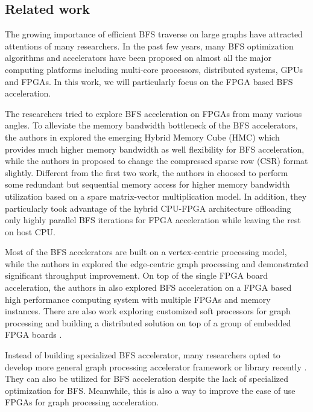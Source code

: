 \subsection{Related work}
The growing importance of efficient BFS traverse on large graphs 
have attracted attentions of many researchers. In the past few years, 
many BFS optimization algorithms and accelerators have been proposed 
on almost all the major computing platforms including multi-core processors, 
distributed systems, GPUs and FPGAs. In this work, we will 
particularly focus on the FPGA based BFS acceleration. 

The researchers tried to explore BFS acceleration 
on FPGAs from many various angles.
To alleviate the memory bandwidth bottleneck of the 
BFS accelerators, the authors in \cite{zhang2017boosting} 
explored the emerging Hybrid Memory Cube (HMC) which provides 
much higher memory bandwidth as well flexibility for BFS 
acceleration, while the authors in \cite{attia2014cygraph} 
proposed to change the compressed sparse row (CSR) format slightly. 
Different from the first two work, the authors in \cite{umuroglu2015hybrid} 
choosed to perform some redundant but sequential memory access for higher memory bandwidth 
utilization based on a spare matrix-vector multiplication model.
In addition, they particularly took advantage of the 
hybrid CPU-FPGA architecture offloading only highly parallel 
BFS iterations for FPGA acceleration while leaving the rest 
on host CPU.  

Most of the BFS accelerators are built on a vertex-centric 
processing model, while the authors 
in \cite{zhou2016high} explored the edge-centric graph processing and demonstrated 
significant throughput improvement. On top of the single FPGA board acceleration, 
the authors in \cite{attia2014cygraph, betkaoui2012reconfigurable} also explored 
BFS acceleration on a FPGA based high performance computing system with multiple 
FPGAs and memory instances. There are also work exploring customized soft processors 
for graph processing and building a distributed solution on 
top of a group of embedded FPGA boards \cite{kapre2015custom, wang2010message}.

Instead of building specialized BFS accelerator, many researchers opted to develop 
more general graph processing accelerator framework or library 
recently \cite{engelhardt2016gravf, oguntebi2016graphops, Dai2017foregraph, dai2016fpgp}. 
They can also be utilized for BFS acceleration despite the lack of 
specialized optimization for BFS. Meanwhile, this is also a way to improve 
the ease of use FPGAs for graph processing acceleration.

